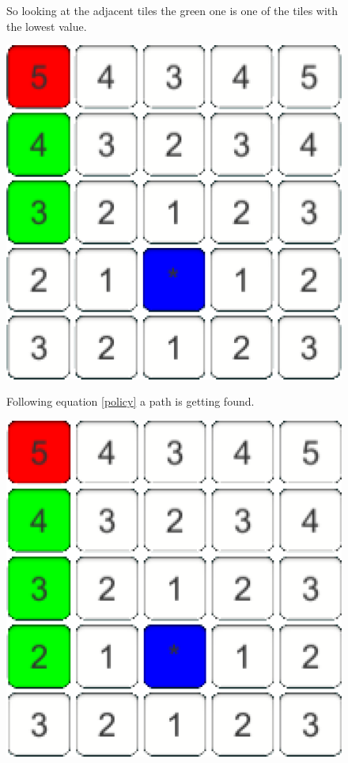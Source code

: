 \documentclass[conference]{IEEEtran}
\begin{document}
\begin{figure}[h]
\begin{minipage}[t]{0.3\linewidth}
\caption{So looking at the adjacent tiles the green one is one of the tiles with the lowest value.}
\end{minipage}
\hfill
\begin{minipage}[t]{0.3\linewidth}
\centering
\includegraphics[width=1\textwidth]{images/FindingPolicy/03.png}
\caption{Following equation \ref{policy} a path is getting found.}
\end{minipage}
\caption{ }
\begin{minipage}[t]{0.3\linewidth}
\centering
\includegraphics[width=1\textwidth]{images/FindingPolicy/04.png}

\end{minipage}
\end{figure}
\end{document}
